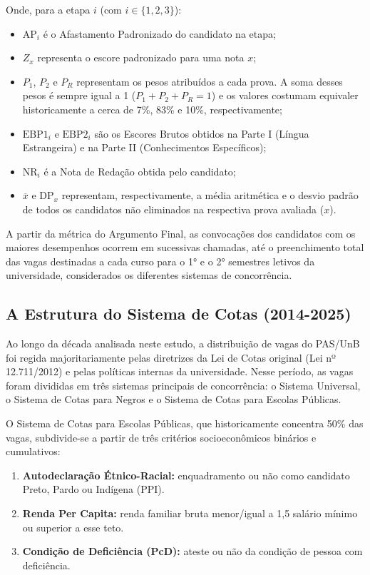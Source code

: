 \documentclass[12pt]{article}
\begin{document}
Onde, para a etapa $i$ (com $i \in \{1, 2, 3\}$):
\begin{itemize}
    \item $\mathrm{AP}_i$ é o Afastamento Padronizado do candidato na etapa;
    \item $Z_x$ representa o escore padronizado para uma nota $x$;
    \item $P_1$, $P_2$ e $P_R$ representam os pesos atribuídos a cada prova. A soma desses pesos é sempre igual a 1 ($P_1 + P_2 + P_R = 1$) e os valores costumam equivaler historicamente a cerca de 7\%, 83\% e 10\%, respectivamente;
    \item $\mathrm{EBP1}_i$ e $\mathrm{EBP2}_i$ são os Escores Brutos obtidos na Parte I (Língua Estrangeira) e na Parte II (Conhecimentos Específicos);
    \item $\mathrm{NR}_i$ é a Nota de Redação obtida pelo candidato;
    \item $\overline{x}$ e $\mathrm{DP}_x$ representam, respectivamente, a média aritmética e o desvio padrão de todos os candidatos não eliminados na respectiva prova avaliada ($x$).
\end{itemize}

A partir da métrica do Argumento Final, as convocações dos candidatos com os maiores desempenhos ocorrem em sucessivas chamadas, até o preenchimento total das vagas destinadas a cada curso para o 1° e o 2° semestres letivos da universidade, considerados os diferentes sistemas de concorrência.

\subsection{A Estrutura do Sistema de Cotas (2014-2025)}

Ao longo da década analisada neste estudo, a distribuição de vagas do PAS/UnB foi regida majoritariamente pelas diretrizes da Lei de Cotas original (Lei nº 12.711/2012) e pelas políticas internas da universidade. Nesse período, as vagas foram divididas em três sistemas principais de concorrência: o Sistema Universal, o Sistema de Cotas para Negros e o Sistema de Cotas para Escolas Públicas.

O Sistema de Cotas para Escolas Públicas, que historicamente concentra 50\% das vagas, subdivide-se a partir de três critérios socioeconômicos binários e cumulativos:

\begin{enumerate}
    \item \textbf{Autodeclaração Étnico-Racial:} enquadramento ou não como candidato Preto, Pardo ou Indígena (PPI).
    \item \textbf{Renda Per Capita:} renda familiar bruta menor/igual a 1,5 salário mínimo ou superior a esse teto.
    \item \textbf{Condição de Deficiência (PcD):} ateste ou não da condição de pessoa com deficiência.
\end{enumerate}
\end{document}
